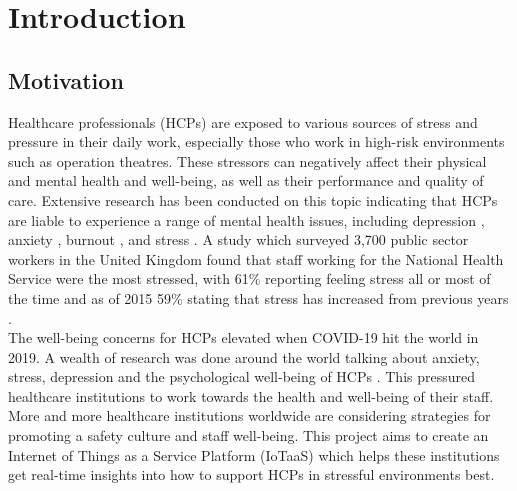 \chapter{Introduction}

\section{Motivation}
Healthcare professionals (HCPs) are exposed to various sources of stress and pressure in their daily work, especially those who work in high-risk environments such as operation theatres. These stressors can negatively affect their physical and mental health and well-being, as well as their performance and quality of care. Extensive research has been conducted on this topic indicating that HCPs are liable to experience a range of mental health issues, including depression \cite{ref1}, anxiety \cite{ref2}, burnout \cite{ref3}, and stress \cite{ref4}. A study which surveyed 3,700 public sector workers in the United Kingdom found that staff working for the National Health Service were the most stressed, with 61\% reporting feeling stress all or most of the time and as of 2015 59\% stating that stress has increased from previous years \cite{ref5}.\\

The well-being concerns for HCPs elevated when COVID-19 hit the world in 2019. A wealth of research was done around the world talking about anxiety, stress, depression and the psychological well-being of HCPs \cite{ref6}\cite{ref7}. This pressured healthcare institutions to work towards the health and well-being of their staff. More and more healthcare institutions worldwide are considering strategies for promoting a safety culture and staff well-being. This project aims to create an Internet of Things as a Service Platform (IoTaaS) which helps these institutions get real-time insights into how to support HCPs in stressful environments best.




